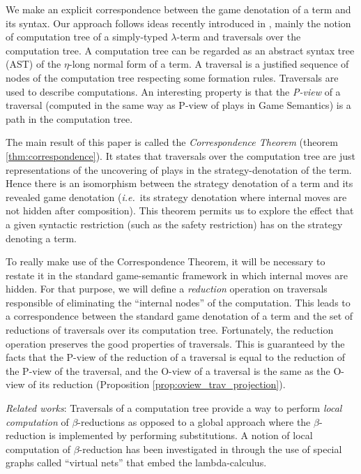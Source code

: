 We make an explicit correspondence between the game denotation of a
term and its syntax. Our approach follows ideas recently introduced
in \cite{OngLics2006}, mainly the notion of computation tree of a
simply-typed $\lambda$-term and traversals over the computation
tree. A computation tree can be regarded as an abstract syntax tree
(AST) of the $\eta$-long normal form of a term. A traversal is a
justified sequence of nodes of the computation tree respecting some
formation rules. Traversals are used to describe computations. An
interesting property is that the \emph{P-view} of a traversal
(computed in the same way as P-view of plays in Game Semantics) is a
path in the computation tree.

The main result of this paper is called the
\emph{Correspondence Theorem} (theorem \ref{thm:correspondence}). It
states that traversals over the computation tree are just
representations of the uncovering of plays in the
strategy-denotation of the term. Hence there is an isomorphism
between the strategy denotation of a term and its revealed game
denotation ({\it i.e.}~its strategy denotation where internal moves are
not hidden after composition). This theorem permits us to explore
the effect that a given syntactic restriction (such as the safety restriction) has on the strategy
denoting a term.

To really make use of the Correspondence Theorem, it will be
necessary to restate it in the standard game-semantic framework in
which internal moves are hidden. For that purpose, we will define a
\emph{reduction} operation on traversals responsible of eliminating
the ``internal nodes'' of the computation. This leads to a
correspondence between the standard game denotation of a term and
the set of reductions of traversals over its computation tree.
Fortunately, the reduction operation preserves the good properties
of traversals. This is guaranteed by the facts that the P-view of
the reduction of a traversal is equal to the reduction of the P-view
of the traversal, and the O-view of a traversal is the same as the
O-view of its reduction (Proposition
\ref{prop:oview_trav_projection}). \vspace{8pt}

\emph{Related works}: Traversals of a computation tree provide a way
to perform \emph{local computation} of $\beta$-reductions as opposed
to a global approach where the $\beta$-reduction is implemented by
performing substitutions. A notion of local computation of
$\beta$-reduction has been investigated in
\cite{DanosRegnier-Localandasynchronou} through the use of special
graphs called ``virtual nets'' that embed the lambda-calculus.

